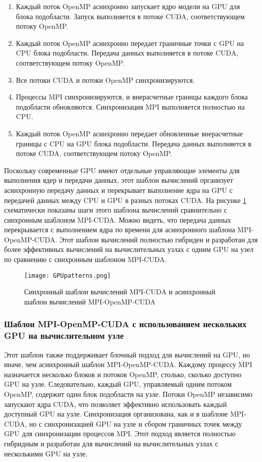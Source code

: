 \begin{enumerate}
\item Каждый поток OpenMP асинхронно запускает ядро модели на GPU для блока подобласти. Запуск выполняется в потоке CUDA, соответствующем потоку OpenMP.
\item Каждый поток OpenMP асинхронно передает граничные точки с GPU на CPU блока подобласти. Передача данных выполняется в потоке CUDA, соответствующем потоку OpenMP.
\item Все потоки CUDA и потоки OpenMP синхронизируются.
\item Процессы MPI синхронизируются, и внерасчетные границы каждого блока подобласти обновляются. Синхронизация MPI выполняется полностью на CPU.
\item Каждый поток OpenMP асинхронно передает обновленные внерасчетные границы с CPU на GPU блока подобласти. Передача данных выполняется в потоке CUDA, соответствующем потоку OpenMP.
\end{enumerate}

Поскольку современные GPU имеют отдельные управляющие элементы для выполнения ядер и передачи данных, этот шаблон вычислений организует асинхронную передачу данных и перекрывает выполнение ядра на GPU с передачей данных между CPU и GPU в разных потоках CUDA. 
На рисунке \ref{fig:GPUpatterns} схематически показаны шаги этого шаблона вычислений сравнительно с синхронным шаблоном MPI-CUDA.
Можно видеть, что передача данных перекрывается с выполнением ядра по времени для асинхронного шаблона MPI-OpenMP-CUDA.
Этот шаблон вычислений полностью гибриден и разработан для более эффективных вычислений на вычислительных узлах с одним GPU на узел по сравнению с синхронным шаблоном MPI-CUDA.

\begin{figure}[!ht]
	\texttt{[image: GPUpatterns.png]}
	\vspace{3pt}
	\caption{Синхронный шаблон вычислений MPI-CUDA и асинхронный шаблон вычислений MPI-OpenMP-CUDA}
	\label{fig:GPUpatterns}
\end{figure}

\subsubsection{Шаблон MPI-OpenMP-CUDA с использованием нескольких GPU на вычислительном узле}

Этот шаблон также поддерживает блочный подход для вычислений на GPU, но иначе, чем асинхронный шаблон MPI-OpenMP-CUDA.
Каждому процессу MPI назначается несколько блоков и потоков OpenMP, столько, сколько доступно GPU на узле. 
Следовательно, каждый GPU, управляемый одним потоком OpenMP, содержит один блок подобласти на узле. 
Потоки OpenMP независимо запускают ядра CUDA, что позволяет эффективно использовать каждый доступный GPU на узле. 
Синхронизация организована, как и в шаблоне MPI-CUDA, но с синхронизацией GPU на узле и сбором граничных точек между GPU для синхронизации процессов MPI. Этот подход является полностью гибридным и разработан для вычислений на вычислительных узлах с несколькими GPU на узле.

